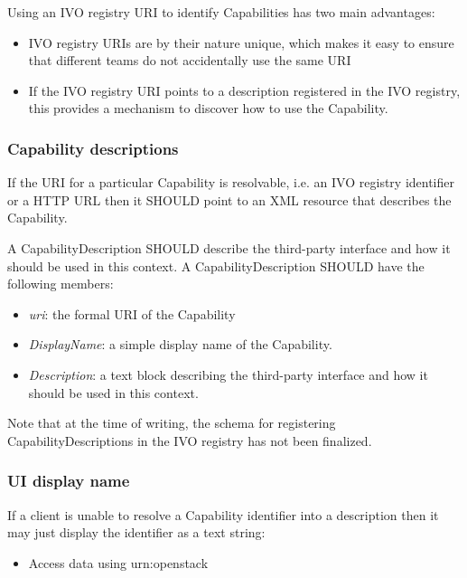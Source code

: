 \documentclass[11pt,a4paper]{ivoa}
\begin{document}
Using an IVO registry URI to identify Capabilities has two main advantages:

\begin{itemize}
    \item IVO registry URIs are by their nature unique, which makes it easy to ensure that different teams do not accidentally use the same URI
    \item If the IVO registry URI points to a description registered in the IVO registry, this provides a mechanism to discover how to use the Capability.
\end{itemize}

\subsubsection{Capability descriptions}
\label{subsubsec:capability descriptions}
If the URI for a particular Capability is resolvable, i.e. an IVO registry identifier or a HTTP URL then it SHOULD point to an XML resource that describes the Capability.

A CapabilityDescription SHOULD describe the third-party interface and how it should be used in this context. A CapabilityDescription SHOULD have the following members:

\begin{itemize}
    \item \emph{uri}: the formal URI of the Capability
    \item \emph{DisplayName}: a simple display name of the Capability.
    \item \emph{Description}: a text block describing the third-party interface and how it should be used in this context.
\end{itemize}

Note that at the time of writing, the schema for registering CapabilityDescriptions in the IVO registry has not been finalized.

\subsubsection{UI display name}
\label{subsubsection:ui display ame}
If a client is unable to resolve a Capability identifier into a description then it may just display the identifier as a text string:

\begin{itemize}
    \item Access data using urn:openstack
\end{itemize}
\end{document}
